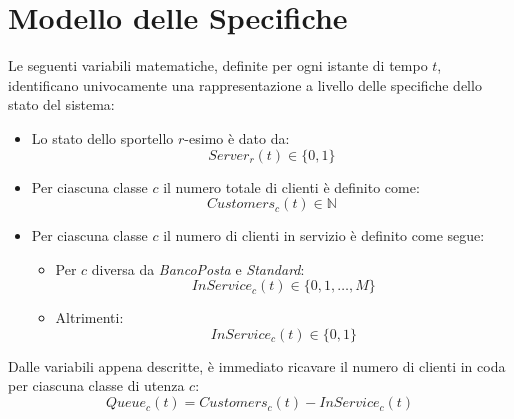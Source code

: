 \chapter{Modello delle Specifiche}\label{chp:modello-specifiche}
Le seguenti variabili matematiche, definite per ogni istante di tempo $t$, identificano univocamente una rappresentazione a livello delle specifiche dello stato del sistema:

\begin{itemize}
\item Lo stato dello sportello $r$-esimo è dato da:
\begin{equation}
\label{eqn:modello-specifiche-3}
Server_r(t) \in \lbrace 0, 1 \rbrace
\end{equation}
\item Per ciascuna classe $c$ il numero totale di clienti è definito come:
\begin{equation}
\label{eqn:modello-specifiche-2}
Customers_c(t) \in \mathbb{N}
\end{equation}
\item Per ciascuna classe $c$ il numero di clienti in servizio è definito come segue:
\begin{itemize}
\item Per $c$ diversa da \sr{} \textsl{BancoPosta} e \sr{} \textsl{Standard}:
\begin{equation}
\label{eqn:modello-specifiche-2}
InService_c(t) \in \lbrace 0, 1, \dots, M \rbrace
\end{equation}
\item Altrimenti:
\begin{equation}
\label{eqn:modello-specifiche-2}
InService_c(t) \in \lbrace 0, 1 \rbrace
\end{equation}
\end{itemize}
\end{itemize}

Dalle variabili appena descritte, è immediato ricavare il numero di clienti in coda per ciascuna classe di utenza $c$:
\begin{equation}
Queue_c(t) = Customers_c(t) - InService_c(t)
\end{equation}

